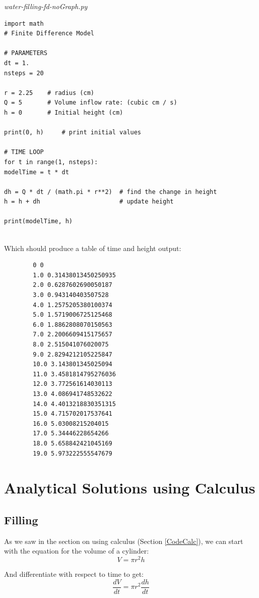 \documentclass[11pt,fleqn]{article}
\begin{document}
	\textit{water-filling-fd-noGraph.py}
\begin{lstlisting}[frame=single]
import math
# Finite Difference Model

# PARAMETERS
dt = 1.
nsteps = 20

r = 2.25    # radius (cm)
Q = 5       # Volume inflow rate: (cubic cm / s)
h = 0       # Initial height (cm)

print(0, h)     # print initial values

# TIME LOOP
for t in range(1, nsteps):
modelTime = t * dt

dh = Q * dt / (math.pi * r**2)  # find the change in height
h = h + dh                      # update height

print(modelTime, h)
	
\end{lstlisting}
	
	Which should produce a table of time and height output:
	
	\begin{lstlisting}
		0 0
		1.0 0.31438013450250935
		2.0 0.6287602690050187
		3.0 0.943140403507528
		4.0 1.2575205380100374
		5.0 1.5719006725125468
		6.0 1.8862808070150563
		7.0 2.2006609415175657
		8.0 2.515041076020075
		9.0 2.8294212105225847
		10.0 3.143801345025094
		11.0 3.4581814795276036
		12.0 3.772561614030113
		13.0 4.086941748532622
		14.0 4.4013218830351315
		15.0 4.715702017537641
		16.0 5.03008215204015
		17.0 5.34446228654266
		18.0 5.658842421045169
		19.0 5.973222555547679
	\end{lstlisting}



\section{Analytical Solutions using Calculus}

	\subsection{Filling}

	As we saw in the section on using calculus (Section \ref{CodeCalc}), we can start with the equation for the volume of a cylinder:
	\begin{equation}
		V = \pi r^2 h
	\end{equation}
	
	And differentiate with respect to time to get:
	\begin{equation}
		\frac{dV}{dt} = \pi r^2 \frac{dh}{dt} 
	\end{equation}
\end{document}
